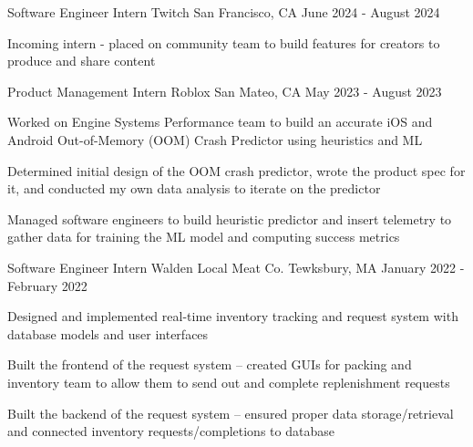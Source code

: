 \documentclass[12pt, letterpaper]{awesome-cv}
\begin{document}
\begin{cventries}
  \cventry
      {Software Engineer Intern} %
      {Twitch} %
      {San Francisco, CA} %
      {June 2024 - August 2024} %
      {
        \begin{cvitems} %
          \item {Incoming intern - placed on community team to build features for creators to produce and share content}
      \end{cvitems}
    }

  \cventry
      {Product Management Intern} %
      {Roblox} %
      {San Mateo, CA} %
      {May 2023 - August 2023} %
      {
        \begin{cvitems} %
          \item {Worked on Engine Systems Performance team to build an accurate iOS and Android Out-of-Memory (OOM) Crash Predictor using heuristics and ML}
          \item {Determined initial design of the OOM crash predictor, wrote the product spec for it, and conducted my own data analysis to iterate on the predictor}
          \item {Managed software engineers to build heuristic predictor and insert telemetry to gather data for training the ML model and computing success metrics}
      \end{cvitems}
    }

  \cventry
      {Software Engineer Intern} %
      {Walden Local Meat Co.} %
      {Tewksbury, MA} %
      {January 2022 - February 2022} %
      {
        \begin{cvitems} %
          \item {Designed and implemented real-time inventory tracking and request system with database models and user interfaces}
          \item {Built the frontend of the request system -- created GUIs for packing and inventory team to allow them to send out and complete replenishment requests}
          \item {Built the backend of the request system -- ensured proper data storage/retrieval and connected inventory requests/completions to database}
      \end{cvitems}
    }


\end{cventries}
\end{document}
